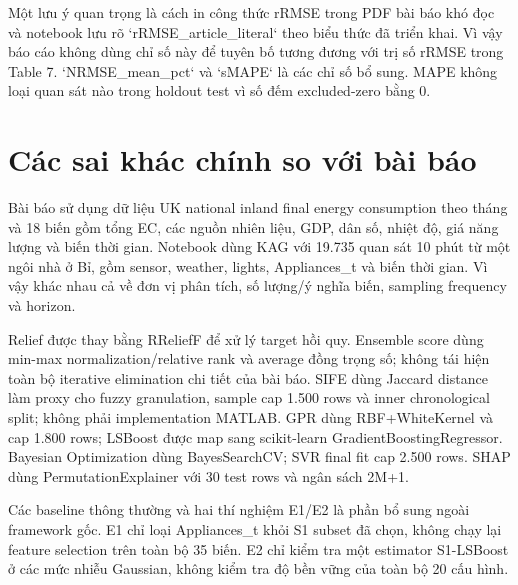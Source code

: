 Một lưu ý quan trọng là cách in công thức rRMSE trong PDF bài báo khó đọc và notebook lưu rõ `rRMSE\_article\_literal` theo biểu thức đã triển khai. Vì vậy báo cáo không dùng chỉ số này để tuyên bố tương đương với trị số rRMSE trong Table 7. `NRMSE\_mean\_pct` và `sMAPE` là các chỉ số bổ sung. MAPE không loại quan sát nào trong holdout test vì số đếm excluded-zero bằng 0.

\section{Các sai khác chính so với bài báo}\label{cuxe1c-sai-khuxe1c-chuxednh-so-vux1edbi-buxe0i-buxe1o}

Bài báo sử dụng dữ liệu UK national inland final energy consumption theo tháng và 18 biến gồm tổng EC, các nguồn nhiên liệu, GDP, dân số, nhiệt độ, giá năng lượng và biến thời gian. Notebook dùng KAG với 19.735 quan sát 10 phút từ một ngôi nhà ở Bỉ, gồm sensor, weather, lights, Appliances\_t và biến thời gian. Vì vậy khác nhau cả về đơn vị phân tích, số lượng/ý nghĩa biến, sampling frequency và horizon.

Relief được thay bằng RReliefF để xử lý target hồi quy. Ensemble score dùng min-max normalization/relative rank và average đồng trọng số; không tái hiện toàn bộ iterative elimination chi tiết của bài báo. SIFE dùng Jaccard distance làm proxy cho fuzzy granulation, sample cap 1.500 rows và inner chronological split; không phải implementation MATLAB. GPR dùng RBF+WhiteKernel và cap 1.800 rows; LSBoost được map sang scikit-learn GradientBoosting\allowbreak Regressor. Bayesian Optimization dùng BayesSearchCV; SVR final fit cap 2.500 rows. SHAP dùng Permutation\allowbreak Explainer với 30 test rows và ngân sách 2M+1.

Các baseline thông thường và hai thí nghiệm E1/E2 là phần bổ sung ngoài framework gốc. E1 chỉ loại Appliances\_t khỏi S1 subset đã chọn, không chạy lại feature selection trên toàn bộ 35 biến. E2 chỉ kiểm tra một estimator S1-LSBoost ở các mức nhiễu Gaussian, không kiểm tra độ bền vững của toàn bộ 20 cấu hình.
